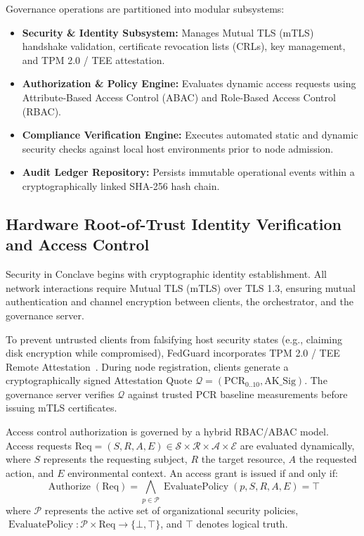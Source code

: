 Governance operations are partitioned into modular subsystems:
\begin{itemize}
    \item \textbf{Security \& Identity Subsystem:} Manages Mutual TLS (mTLS) handshake validation, certificate revocation lists (CRLs), key management, and TPM 2.0 / TEE attestation.
    \item \textbf{Authorization \& Policy Engine:} Evaluates dynamic access requests using Attribute-Based Access Control (ABAC) and Role-Based Access Control (RBAC).
    \item \textbf{Compliance Verification Engine:} Executes automated static and dynamic security checks against local host environments prior to node admission.
    \item \textbf{Audit Ledger Repository:} Persists immutable operational events within a cryptographically linked SHA-256 hash chain.
\end{itemize}

\subsection{Hardware Root-of-Trust Identity Verification and Access Control}

Security in Conclave begins with cryptographic identity establishment. All network interactions require Mutual TLS (mTLS) over TLS 1.3, ensuring mutual authentication and channel encryption between clients, the orchestrator, and the governance server.

To prevent untrusted clients from falsifying host security states (e.g., claiming disk encryption while compromised), FedGuard incorporates TPM 2.0 / TEE Remote Attestation~\cite{mo2021ppfl}. During node registration, clients generate a cryptographically signed Attestation Quote $\mathcal{Q} = (\text{PCR}_{0..10}, \text{AK\_Sig})$. The governance server verifies $\mathcal{Q}$ against trusted PCR baseline measurements before issuing mTLS certificates.

Access control authorization is governed by a hybrid RBAC/ABAC model. Access requests $\text{Req} = (S, R, A, E) \in \mathcal{S} \times \mathcal{R} \times \mathcal{A} \times \mathcal{E}$ are evaluated dynamically, where $S$ represents the requesting subject, $R$ the target resource, $A$ the requested action, and $E$ environmental context. An access grant is issued if and only if:
\begin{equation}
    \operatorname{Authorize}(\text{Req}) = \bigwedge_{p \in \mathcal{P}} \operatorname{EvaluatePolicy}(p, S, R, A, E) = \top
\end{equation}
where $\mathcal{P}$ represents the active set of organizational security policies, $\operatorname{EvaluatePolicy}: \mathcal{P} \times \text{Req} \to \{\bot, \top\}$, and $\top$ denotes logical truth.

